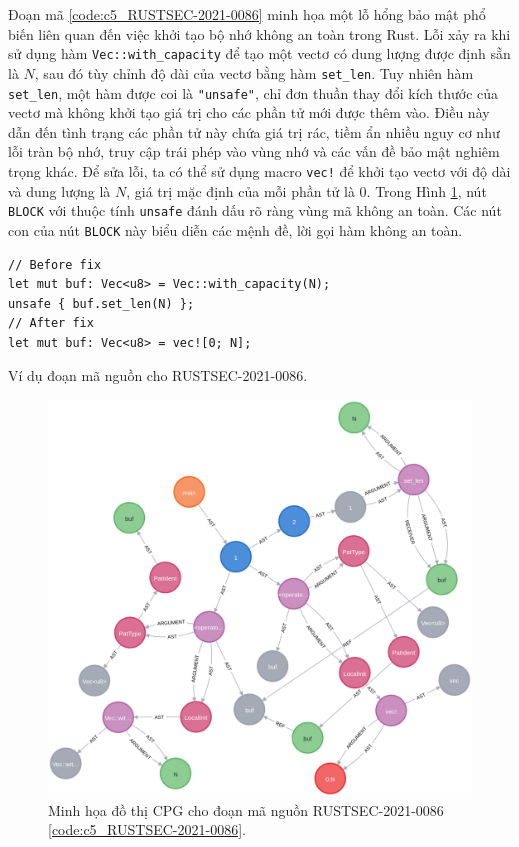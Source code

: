Đoạn mã \ref{code:c5_RUSTSEC-2021-0086} minh họa một lỗ hổng bảo mật phổ biến liên quan đến việc khởi tạo bộ nhớ không an toàn trong Rust.
Lỗi xảy ra khi sử dụng hàm \texttt{Vec::with\_capacity} để tạo một vectơ có dung lượng được định sẵn là $N$, sau đó tùy chỉnh độ dài của vectơ bằng hàm \texttt{set\_len}.
Tuy nhiên hàm \texttt{set\_len}, một hàm được coi là \texttt{"unsafe"}, chỉ đơn thuần thay đổi kích thước của vectơ mà không khởi tạo giá trị cho các phần tử mới được thêm vào.
Điều này dẫn đến tình trạng các phần tử này chứa giá trị rác, tiềm ẩn nhiều nguy cơ như lỗi tràn bộ nhớ, truy cập trái phép vào vùng nhớ và các vấn đề bảo mật nghiêm trọng khác.
Để sửa lỗi, ta có thể sử dụng macro \texttt{vec!} để khởi tạo vectơ với độ dài và dung lượng là $N$, giá trị mặc định của mỗi phần tử là $0$.
Trong Hình \ref{img:c5_RUSTSEC-2021-0086}, nút \texttt{BLOCK} với thuộc tính \texttt{unsafe} đánh dấu rõ ràng vùng mã không an toàn.
Các nút con của nút \texttt{BLOCK} này biểu diễn các mệnh đề, lời gọi hàm không an toàn.

\begin{listing}[H]
\begin{verbatim}
// Before fix
let mut buf: Vec<u8> = Vec::with_capacity(N);
unsafe { buf.set_len(N) };
// After fix
let mut buf: Vec<u8> = vec![0; N];
\end{verbatim}
\caption{Ví dụ đoạn mã nguồn cho RUSTSEC-2021-0086.}
\label{code:c5_RUSTSEC-2021-0086}
\end{listing}

\begin{figure}[H]
    \includegraphics[width=1\columnwidth]{figures/c5/c5_RUSTSEC-2021-0086}
    \centering
    \caption{Minh họa đồ thị CPG cho đoạn mã nguồn RUSTSEC-2021-0086 \ref{code:c5_RUSTSEC-2021-0086}.}
    \label{img:c5_RUSTSEC-2021-0086}
\end{figure}


